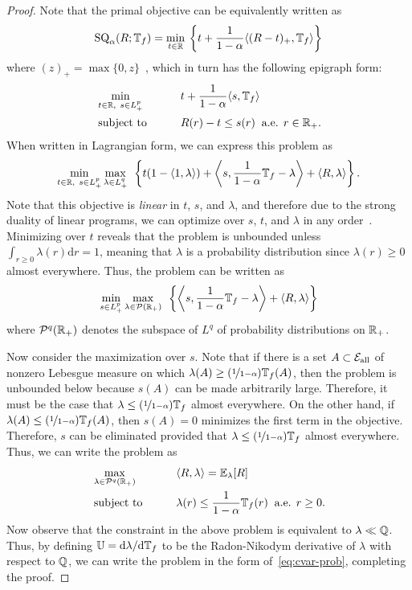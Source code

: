 \documentclass{article}
\begin{document}
\begin{proof}
Note that the primal objective can be equivalently written as
%
\begin{align}
    \operatorname{SQ}_\alpha(R; \mathbb{T}_f) = \min_{t\in\mathbb{R}} \:  \left\{ t + \frac{1}{1-\alpha} \langle  (R - t)_+, \mathbb{T}_f \rangle \right\}
\end{align}
%
where $(z)_+ = \max\{0,z\}$~\cite{rockafellar2000CVaR}, which in turn has the following epigraph form:
%
\begin{alignat}{2}
    &\min_{t\in\mathbb{R}, \:\: s\in L^p_+} && t + \frac{1}{1-\alpha} \langle s, \mathbb{T}_f \rangle \\
    &\operatorname*{subject\,\, to \qquad} && R(r) - t \leq s(r) \:\text{ a.e. } r\in\mathbb{R}_+.
\end{alignat}
%
When written in Lagrangian form, we can express this problem as
%
\begin{align}
    \min_{t\in\mathbb{R}, \:\: s\in L^p_+} \max_{\lambda\in L^q_+}  \:\: \left\{t(1 - \langle 1, \lambda\rangle) +  \left\langle s, \frac{1}{1-\alpha}\mathbb{T}_f - \lambda \right\rangle + \langle R, \lambda\rangle \right\}.
\end{align}
%
Note that this objective is \emph{linear} in $t$, $s$, and $\lambda$, and therefore due to the strong duality of linear programs, we can optimize over $s$, $t$, and $\lambda$ in any order~\cite{boyd2004convex}.  Minimizing over $t$ reveals that the problem is unbounded unless $\int_{r\geq 0} \lambda(r)\text{d}r = 1$, meaning that $\lambda$ is a probability distribution since $\lambda(r)\geq 0$ almost everywhere.  Thus, the problem can be written as
%
\begin{align}
    \min_{s\in L^p_+} \max_{\lambda\in\mathcal{P}(\mathbb{R}_+)} \:\: \left\{ \left\langle s, \frac{1}{1-\alpha}\mathbb{T}_f - \lambda \right\rangle + \langle R, \lambda\rangle \right\}
\end{align}
%
where $\mathcal{P}^q(\mathbb{R}_+)$ denotes the subspace of $L^q$ of probability distributions on $\mathbb{R}_+$.

Now consider the maximization over $s$.  Note that if there is a set $A\subset{\mathcal{E}_\text{all}}$ of nonzero Lebesgue measure on which $\lambda(A) \geq (\nicefrac{1}{1-\alpha})\mathbb{T}_f(A)$, then the problem is unbounded below because $s(A)$ can be made arbitrarily large.  Therefore, it must be the case that $\lambda \leq (\nicefrac{1}{1-\alpha})\mathbb{T}_f$ almost everywhere.  On the other hand, if $\lambda(A) \leq (\nicefrac{1}{1-\alpha})\mathbb{T}_f(A)$, then $s(A) = 0$ minimizes the first term in the objective.  Therefore, $s$ can be eliminated provided that $\lambda\leq (\nicefrac{1}{1-\alpha})\mathbb{T}_f$ almost everywhere.  Thus, we can write the problem as
%
\begin{alignat}{2}
    &\max_{\lambda\in\mathcal{P}^q(\mathbb{R}_+)} &&\langle R, \lambda\rangle = \operatorname{\mathbb{E}}_{\lambda}[R] \\
    &\operatorname*{subject\,\, to \qquad} && \lambda(r) \leq \frac{1}{1-\alpha}\mathbb{T}_f(r) \:\text{ a.e. } r\geq 0.
\end{alignat}
%
Now observe that the constraint in the above problem is equivalent to $\lambda\ll\mathbb{Q}$.  Thus, by defining $\mathbb{U} = \text{d}\lambda/\text{d}\mathbb{T}_f$ to be the Radon-Nikodym derivative of $\lambda$ with respect to $\mathbb{Q}$, we can write the problem in the form of~\eqref{eq:cvar-prob}, completing the proof.
\end{proof}
\end{document}
